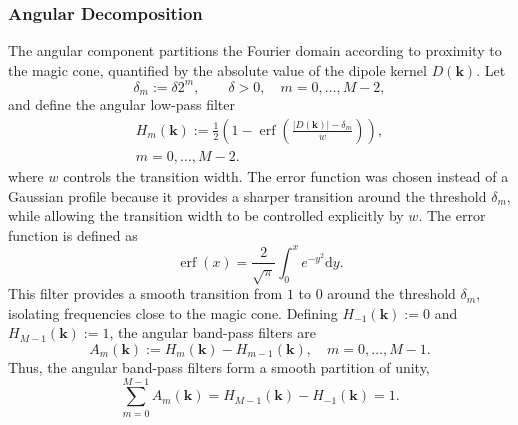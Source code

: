 \documentclass{article}
\begin{document}
\subsubsection{Angular Decomposition}\label{sec:theoryAngular}
The angular component partitions the Fourier domain according to proximity to the magic cone, quantified by the absolute value of the dipole kernel $D(\mathbf{k})$. Let
\begin{equation}  
\delta_m:=\delta 2^{m}, \qquad \delta>0, \quad m=0,\ldots,M-2, 
\end{equation}
\noindent
and define the angular low-pass filter
\begin{equation}
\label{eqn:dipoleletAngularLowpass}
\begin{aligned}
    H_m(\mathbf{k}) := \frac{1}{2} \left( 1 - \operatorname{erf}\left( \frac{|D(\mathbf{k})| - \delta_{m}}{w} \right) \right), \\
    m=0,\ldots,M-2.
\end{aligned}
\end{equation}
\noindent
where $w$ controls the transition width. The error function was chosen instead of a Gaussian profile because it provides a sharper transition around the threshold $\delta_m$, while allowing the transition width to be controlled explicitly by $w$. The error function is defined as
\begin{equation}
\label{eqn:errorFunctionDef}
\operatorname{erf}(x) = \frac{2}{\sqrt{\pi}} \int_{0}^{x} e^{-y^2} \mathrm{d}y.
\end{equation}
This filter provides a smooth transition from $1$ to $0$ around the threshold
$\delta_m$, isolating frequencies close to the magic cone. Defining $H_{-1}(\mathbf{k}) := 0$ and $H_{M-1}(\mathbf{k}):=1$, the angular band-pass filters are
\begin{equation} \label{eqn:angularWindow} 
A_m(\mathbf{k}) := H_m(\mathbf{k}) - H_{m-1}(\mathbf{k}), \quad m=0,\ldots,M-1. 
\end{equation}
\noindent
Thus, the angular band-pass filters form a smooth partition of unity,
\begin{equation} \label{eqn:angularPartition} 
\sum_{m=0}^{M-1} A_m(\mathbf{k}) = H_{M-1}(\mathbf{k}) - H_{-1}(\mathbf{k}) = 1. 
\end{equation}
\end{document}
